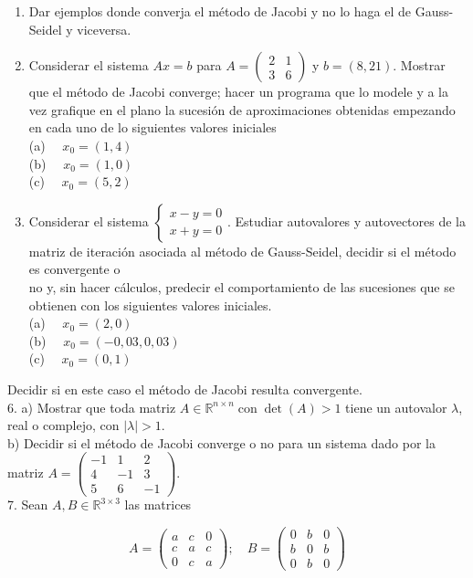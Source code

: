 \documentclass[10pt]{article}
\begin{document}
\begin{enumerate}
  \item Dar ejemplos donde converja el método de Jacobi y no lo haga el de Gauss-Seidel y viceversa.
  \item Considerar el sistema $A x=b$ para $A=\left(\begin{array}{ll}2 & 1 \\ 3 & 6\end{array}\right)$ y $b=(8,21)$. Mostrar que el método de Jacobi converge; hacer un programa que lo modele y a la vez grafique en el plano la sucesión de aproximaciones obtenidas empezando en cada uno de lo siguientes valores iniciales\\
(a) $\quad x_{0}=(1,4)$\\
(b) $\quad x_{0}=(1,0)$\\
(c) $\quad x_{0}=(5,2)$
  \item Considerar el sistema $\left\{\begin{array}{l}x-y=0 \\ x+y=0\end{array}\right.$. Estudiar autovalores y autovectores de la matriz de iteración asociada al método de Gauss-Seidel, decidir si el método es convergente o\\
no y, sin hacer cálculos, predecir el comportamiento de las sucesiones que se obtienen con los siguientes valores iniciales.\\
(a) $\quad x_{0}=(2,0)$\\
(b) $\quad x_{0}=(-0,03,0,03)$\\
(c) $\quad x_{0}=(0,1)$
\end{enumerate}

Decidir si en este caso el método de Jacobi resulta convergente.\\
6. a) Mostrar que toda matriz $A \in \mathbb{R}^{n \times n} \operatorname{con} \operatorname{det}(A)>1$ tiene un autovalor $\lambda$, real o complejo, con $|\lambda|>1$.\\
b) Decidir si el método de Jacobi converge o no para un sistema dado por la matriz $A=\left(\begin{array}{ccc}-1 & 1 & 2 \\ 4 & -1 & 3 \\ 5 & 6 & -1\end{array}\right)$.\\
7. Sean $A, B \in \mathbb{R}^{3 \times 3}$ las matrices

$$
A=\left(\begin{array}{ccc}
a & c & 0 \\
c & a & c \\
0 & c & a
\end{array}\right) ; \quad B=\left(\begin{array}{ccc}
0 & b & 0 \\
b & 0 & b \\
0 & b & 0
\end{array}\right)
$$
\end{document}
